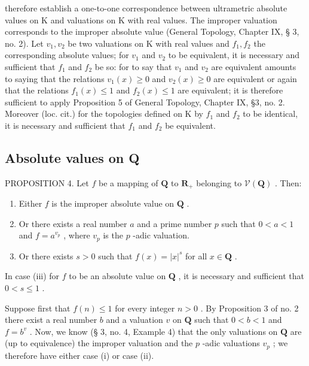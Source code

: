 therefore establish a one-to-one correspondence between ultrametric absolute values on K and valuations on K with real values. The improper valuation corresponds to the improper absolute value (General Topology, Chapter IX, § 3, no. 2). Let \(v_{1}, v_{2}\) be two valuations on K with real values and \(f_{1}, f_{2}\) the corresponding absolute values; for \(v_{1}\) and \(v_{2}\) to be equivalent, it is necessary and sufficient that \(f_{1}\) and \(f_{2}\) be so: for to say that \(v_{1}\) and \(v_{2}\) are equivalent amounts to saying that the relations \(v_{1}(x) \geqslant 0\) and \(v_{2}(x) \geqslant 0\) are equivalent or again that the relations \(f_{1}(x) \leqslant 1\) and \(f_{2}(x) \leqslant 1\) are equivalent; it is therefore sufficient to apply Proposition 5 of General Topology, Chapter IX, §3, no. 2. Moreover (loc. cit.) for the topologies defined on K by \(f_{1}\) and \(f_{2}\) to be identical, it is necessary and sufficient that \(f_{1}\) and \(f_{2}\) be equivalent.

\subsection{Absolute values on Q}

PROPOSITION 4. Let \(f\) be a mapping of \(\mathbf{Q}\) to \(\mathbf{R}_+\) belonging to \(\mathcal{V}(\mathbf{Q})\) . Then:

\begin{enumerate}
\def\labelenumi{(\roman{enumi})}
\item
  Either \(f\) is the improper absolute value on \(\mathbf{Q}\) .
\item
  Or there exists a real number \(a\) and a prime number \(p\) such that \(0 < a < 1\) and \(f = a^{v_p}\) , where \(v_p\) is the \(p\) -adic valuation.
\item
  Or there exists \(s > 0\) such that \(f(x) = |x|^s\) for all \(x \in \mathbf{Q}\) .
\end{enumerate}

In case (iii) for \(f\) to be an absolute value on \(\mathbf{Q}\) , it is necessary and sufficient that \(0 < s \leqslant 1\) .

Suppose first that \(f(n) \leqslant 1\) for every integer \(n > 0\) . By Proposition 3 of no. 2 there exist a real number \(b\) and a valuation \(v\) on \(\mathbf{Q}\) such that \(0 < b < 1\) and \(f = b^v\) . Now, we know (§ 3, no. 4, Example 4) that the only valuations on \(\mathbf{Q}\) are (up to equivalence) the improper valuation and the \(p\) -adic valuations \(v_p\) ; we therefore have either case (i) or case (ii).

